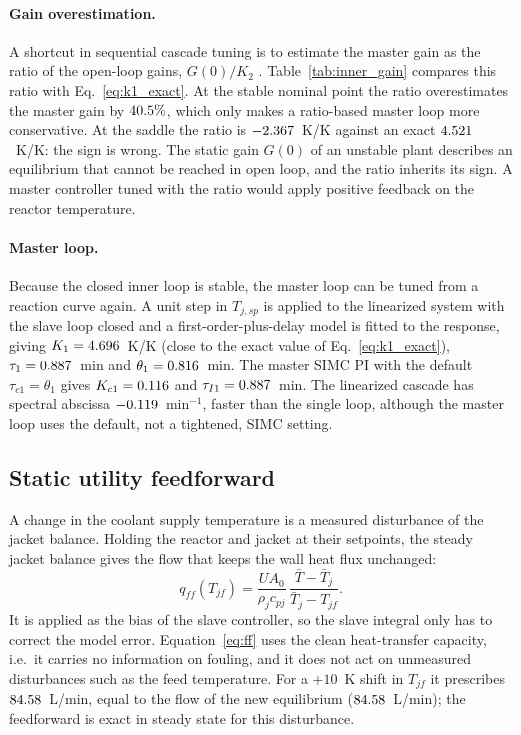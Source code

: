 \paragraph{Gain overestimation.} A shortcut in sequential cascade tuning is to estimate the master gain as the ratio of the open-loop gains, $G(0)/K_2$ \cite{seborg2010process,shinskey1996process,luyben2007chemical}. Table~\ref{tab:inner_gain} compares this ratio with Eq.~\eqref{eq:k1_exact}. At the stable nominal point the ratio overestimates the master gain by $40.5\%$, which only makes a ratio-based master loop more conservative. At the saddle the ratio is $-2.367$~K/K against an exact $4.521$~K/K: the sign is wrong. The static gain $G(0)$ of an unstable plant describes an equilibrium that cannot be reached in open loop, and the ratio inherits its sign. A master controller tuned with the ratio would apply positive feedback on the reactor temperature.



\paragraph{Master loop.} Because the closed inner loop is stable, the master loop can be tuned from a reaction curve again. A unit step in $T_{j,sp}$ is applied to the linearized system with the slave loop closed and a first-order-plus-delay model is fitted to the response, giving $K_1=4.696$~K/K (close to the exact value of Eq.~\eqref{eq:k1_exact}), $\tau_1=0.887$~min and $\theta_1=0.816$~min. The master SIMC PI with the default $\tau_{c1}=\theta_1$ gives $K_{c1}=0.116$ and $\tau_{I1}=0.887$~min. The linearized cascade has spectral abscissa $-0.119$~min$^{-1}$, faster than the single loop, although the master loop uses the default, not a tightened, SIMC setting.

\subsection{Static utility feedforward}
\label{subsec:ff}
A change in the coolant supply temperature is a measured disturbance of the jacket balance. Holding the reactor and jacket at their setpoints, the steady jacket balance gives the flow that keeps the wall heat flux unchanged:
\begin{equation}
q_{ff}(T_{jf}) = \frac{UA_0}{\rho_jc_{pj}}\,\frac{\bar T-\bar T_j}{\bar T_j-T_{jf}}.
\label{eq:ff}
\end{equation}
It is applied as the bias of the slave controller, so the slave integral only has to correct the model error. Equation~\eqref{eq:ff} uses the clean heat-transfer capacity, i.e.\ it carries no information on fouling, and it does not act on unmeasured disturbances such as the feed temperature. For a $+10$~K shift in $T_{jf}$ it prescribes $84.58$~L/min, equal to the flow of the new equilibrium ($84.58$~L/min); the feedforward is exact in steady state for this disturbance.
